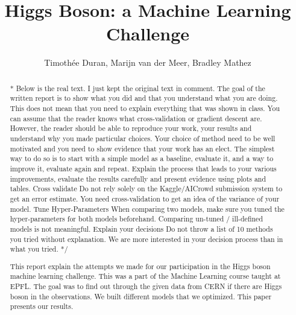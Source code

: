 \documentclass[10pt,conference,compsocconf]{IEEEtran}
\begin{document}
\title{Higgs Boson: a Machine Learning Challenge}

\author{Timothée Duran, Marijn van der Meer, Bradley Mathez}

\maketitle
\begin{abstract}
    \/* Below is the real text. I just kept the original text in comment.
    The goal of the written report is to show what you did and that you understand what you are doing. This does
    not mean that you need to explain everything that was shown in class. You can assume that the reader knows
    what cross-validation or gradient descent are. However, the reader should be able to reproduce your work, your results and understand why you made particular choices. Your choice of method need to be well motivated and you need to show evidence that your work has an elect.
    The simplest way to do so is to start with a simple model as a baseline, evaluate it, and a way to improve it, evaluate again and repeat. Explain the process that leads to your various improvements, evaluate the results carefully and present evidence using plots and tables.
    Cross validate
    Do not rely solely on the Kaggle/AICrowd submission system to get an error estimate. You need cross-validation to get an idea of the variance of your model.
    Tune Hyper-Parameters
    When comparing two models, make sure you tuned the hyper-parameters for both models beforehand.
    Comparing un-tuned / ill-defined models is not meaningful.
    Explain your decisions
    Do not throw a list of 10 methods you tried without explanation. We are more interested in your decision
    process than in what you tried.
    */
    
    This report explain the attempts we made for our participation in the Higgs boson machine learning challenge. This was a part of the Machine Learning course taught at EPFL. The goal was to find out through the given data from CERN if there are Higgs boson in the observations. We built different models that we optimized. This paper presents our results. 
\end{abstract}
\end{document}
